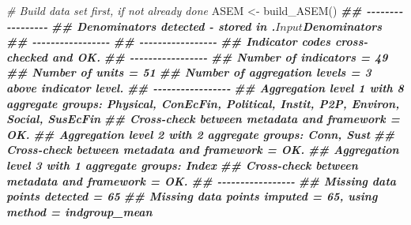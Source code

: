 \documentclass[
]{book}
\newenvironment{Shaded}{\begin{snugshade}}{\end{snugshade}}
\newcommand{\CommentTok}[1]{\textcolor[rgb]{0.56,0.35,0.01}{\textit{#1}}}
\newcommand{\DocumentationTok}[1]{\textcolor[rgb]{0.56,0.35,0.01}{\textbf{\textit{#1}}}}
\newcommand{\FunctionTok}[1]{\textcolor[rgb]{0.00,0.00,0.00}{#1}}
\newcommand{\NormalTok}[1]{#1}
\newcommand{\OtherTok}[1]{\textcolor[rgb]{0.56,0.35,0.01}{#1}}
\begin{document}
\begin{Shaded}
\begin{Highlighting}[]
\CommentTok{\# Build data set first, if not already done}
\NormalTok{ASEM }\OtherTok{\textless{}{-}} \FunctionTok{build\_ASEM}\NormalTok{()}
\DocumentationTok{\#\# {-}{-}{-}{-}{-}{-}{-}{-}{-}{-}{-}{-}{-}{-}{-}{-}{-}}
\DocumentationTok{\#\# Denominators detected {-} stored in .$Input$Denominators}
\DocumentationTok{\#\# {-}{-}{-}{-}{-}{-}{-}{-}{-}{-}{-}{-}{-}{-}{-}{-}{-}}
\DocumentationTok{\#\# {-}{-}{-}{-}{-}{-}{-}{-}{-}{-}{-}{-}{-}{-}{-}{-}{-}}
\DocumentationTok{\#\# Indicator codes cross{-}checked and OK.}
\DocumentationTok{\#\# {-}{-}{-}{-}{-}{-}{-}{-}{-}{-}{-}{-}{-}{-}{-}{-}{-}}
\DocumentationTok{\#\# Number of indicators = 49}
\DocumentationTok{\#\# Number of units = 51}
\DocumentationTok{\#\# Number of aggregation levels = 3 above indicator level.}
\DocumentationTok{\#\# {-}{-}{-}{-}{-}{-}{-}{-}{-}{-}{-}{-}{-}{-}{-}{-}{-}}
\DocumentationTok{\#\# Aggregation level 1 with 8 aggregate groups: Physical, ConEcFin, Political, Instit, P2P, Environ, Social, SusEcFin}
\DocumentationTok{\#\# Cross{-}check between metadata and framework = OK.}
\DocumentationTok{\#\# Aggregation level 2 with 2 aggregate groups: Conn, Sust}
\DocumentationTok{\#\# Cross{-}check between metadata and framework = OK.}
\DocumentationTok{\#\# Aggregation level 3 with 1 aggregate groups: Index}
\DocumentationTok{\#\# Cross{-}check between metadata and framework = OK.}
\DocumentationTok{\#\# {-}{-}{-}{-}{-}{-}{-}{-}{-}{-}{-}{-}{-}{-}{-}{-}{-}}
\DocumentationTok{\#\# Missing data points detected = 65}
\DocumentationTok{\#\# Missing data points imputed = 65, using method = indgroup\_mean}


\end{Highlighting}
\end{Shaded}
\end{document}
